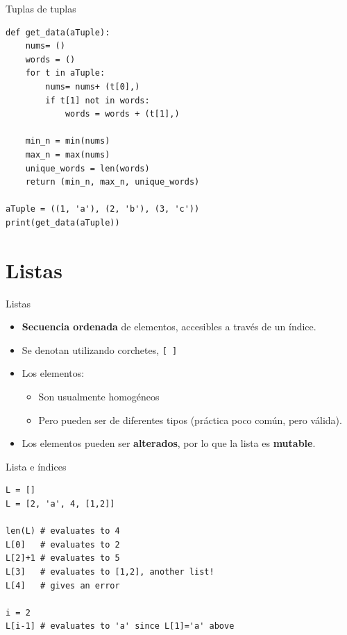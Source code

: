 \documentclass[mathserif]{beamer}
\begin{document}
\begin{frame}[fragile]{Tuplas de tuplas}
\begin{lstlisting}
def get_data(aTuple):
    nums= ()
    words = ()
    for t in aTuple:
        nums= nums+ (t[0],)
        if t[1] not in words:
            words = words + (t[1],)
    
    min_n = min(nums)
    max_n = max(nums)
    unique_words = len(words)
    return (min_n, max_n, unique_words)
    
aTuple = ((1, 'a'), (2, 'b'), (3, 'c'))
print(get_data(aTuple))
\end{lstlisting}
\end{frame}

\section{Listas}
\begin{frame}[fragile]{Listas}
    \begin{itemize}
        \item {\blue\bfseries Secuencia ordenada} de elementos, accesibles a través de un {\blue índice}.
        \item Se denotan utilizando {\blue corchetes}, \lstinline|[ ]|
        \item Los elementos: 
            \begin{itemize}
                \item Son usualmente {\orange homogéneos}
                \item Pero pueden ser de diferentes tipos (práctica poco común, pero válida).
            \end{itemize}
        
        \item Los elementos pueden ser {\orange\bfseries alterados}, por lo que la lista es {\orange\bfseries mutable}.
    \end{itemize}
\end{frame}

\begin{frame}[fragile]{Lista e índices}
\begin{lstlisting}
L = []
L = [2, 'a', 4, [1,2]]

len(L) # evaluates to 4
L[0]   # evaluates to 2
L[2]+1 # evaluates to 5
L[3]   # evaluates to [1,2], another list!
L[4]   # gives an error

i = 2
L[i-1] # evaluates to 'a' since L[1]='a' above
\end{lstlisting}
\end{frame}
\end{document}
